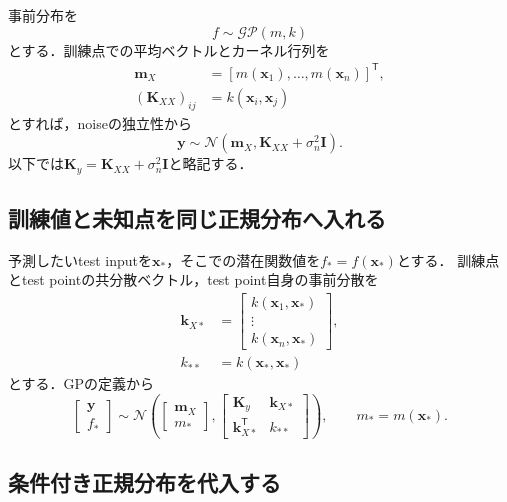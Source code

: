 \documentclass[a4paper,11pt]{ltjsarticle}
\newcommand{\N}{\mathcal N}
\newcommand{\GP}{\mathcal{GP}}
\newcommand{\I}{\bm I}
\newcommand{\T}{\mathsf T}
\begin{document}
事前分布を
\begin{equation}
  f\sim\GP(m,k)
\end{equation}
とする．訓練点での平均ベクトルとカーネル行列を
\begin{align}
  \bm m_X&=[m(\bm x_1),\ldots,m(\bm x_n)]^\T,\\
  (\bm K_{XX})_{ij}&=k(\bm x_i,\bm x_j)
\end{align}
とすれば，noiseの独立性から
\begin{equation}
  \bm y\sim\N(\bm m_X,\bm K_{XX}+\sigma_n^2\I).
  \label{eq:y-prior}
\end{equation}
以下では\(\bm K_y=\bm K_{XX}+\sigma_n^2\I\)と略記する．

\subsection{訓練値と未知点を同じ正規分布へ入れる}

予測したいtest inputを\(\bm x_*\)，そこでの潜在関数値を\(f_*=f(\bm x_*)\)とする．
訓練点とtest pointの共分散ベクトル，test point自身の事前分散を
\begin{align}
  \bm k_{X*}
  &=\begin{bmatrix}
  k(\bm x_1,\bm x_*)\\\vdots\\k(\bm x_n,\bm x_*)
  \end{bmatrix},\\
  k_{**}&=k(\bm x_*,\bm x_*)
\end{align}
とする．GPの定義から
\begin{equation}
  \begin{bmatrix}\bm y\\f_*\end{bmatrix}
  \sim\N\left(
  \begin{bmatrix}\bm m_X\\m_*\end{bmatrix},
  \begin{bmatrix}
    \bm K_y&\bm k_{X*}\\
    \bm k_{X*}^\T&k_{**}
  \end{bmatrix}
  \right),
  \qquad m_*=m(\bm x_*).
  \label{eq:gpr-joint-prior}
\end{equation}

\subsection{条件付き正規分布を代入する}
\end{document}
